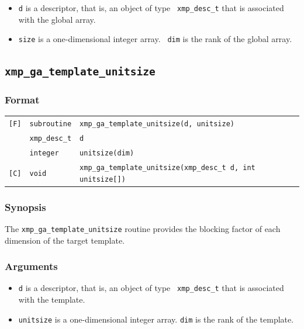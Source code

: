 \begin{itemize}
 \item {\tt d} is a descriptor, that is, an object of type {\tt
       xmp\_desc\_t} that is associated with the global array.
 \item {\tt size} is a one-dimensional integer array. {\tt
       dim} is the rank of the global array.
\end{itemize}

\subsection{\tt xmp\_ga\_template\_unitsize}

\subsubsection*{Format}

\begin{tabular}{lll}

\verb![F]!&  {\tt subroutine}& {\tt xmp\_ga\_template\_unitsize(d, unitsize)}\\
          & {\tt xmp\_desc\_t} & {\tt d}\\
          & {\tt integer} & {\tt unitsize(dim)}\\

\verb![C]!&  {\tt void}& {\tt xmp\_ga\_template\_unitsize(xmp\_desc\_t d, int unitsize[])}\\

\end{tabular}

\subsubsection*{Synopsis}

The {\tt xmp\_ga\_template\_unitsize} routine provides the blocking
factor of each dimension of the target template.

\subsubsection*{Arguments}

\begin{itemize}
 \item {\tt d} is a descriptor, that is, an object of type {\tt
       xmp\_desc\_t} that is associated with the template.
 \item {\tt unitsize} is a one-dimensional integer array. {\tt dim} is
       the rank of the template.
\end{itemize}



